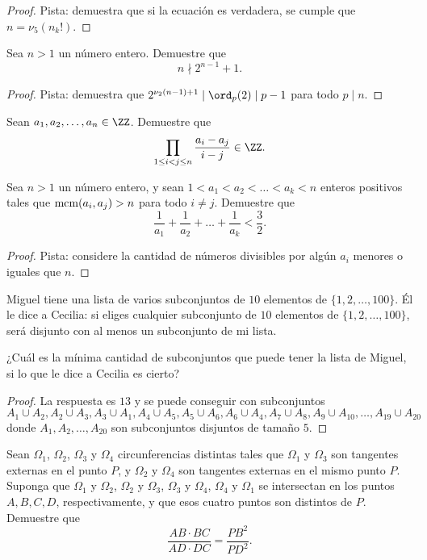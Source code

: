 \begin{proof}
	Pista: demuestra que si la ecuación es verdadera, se cumple que $n=\nu_5(n_k!)$.
\end{proof}

\begin{probEG}
	Sea $n>1$ un número entero. Demuestre que
	\[n\nmid 2^{n-1}+1.\]
\end{probEG}

\begin{proof}
	Pista: demuestra que $2^{\nu_2(n-1)+1}\mid\ord_p(2)\mid p-1$ para todo $p\mid n$.
\end{proof}

\begin{probMG}
	Sean $a_1,a_2,\dots,a_n\in\ZZ$. Demuestre que
	\[\prod_{1\le i<j\le n}\frac{a_i-a_j}{i-j}\in\ZZ.\]
\end{probMG}

\begin{probMR}
	Sea $n>1$ un número entero, y sean $1<a_1<a_2<\dots<a_k<n$ enteros positivos tales que $\operatorname{mcm}(a_i,a_j)>n$ para todo $i\ne j$. Demuestre que
	\[\frac{1}{a_1}+\frac{1}{a_2}+\dots+\frac{1}{a_k}<\frac32.\]
\end{probMR}

\begin{proof}
	Pista: considere la cantidad de números divisibles por algún $a_i$ menores o iguales que $n$.
\end{proof}

\begin{probEG}
	Miguel tiene una lista de varios subconjuntos de $10$ elementos de $\{1,2,\dots,100\}$. Él le dice a Cecilia: si eliges cualquier subconjunto de $10$ elementos de $\{1,2,\dots,100\}$, será disjunto con al menos un subconjunto de mi lista.

	¿Cuál es la mínima cantidad de subconjuntos que puede tener la lista de Miguel, si lo que le dice a Cecilia es cierto?
\end{probEG}

\begin{proof}
	La respuesta es $13$ y se puede conseguir con subconjuntos
	\[A_1\cup A_2,A_2\cup A_3,A_3\cup A_1,A_4\cup A_5,A_5\cup A_6,A_6\cup A_4,A_7\cup A_8,A_9\cup A_{10},\dots,A_{19}\cup A_{20}\]
	donde $A_1,A_2,\dots,A_{20}$ son subconjuntos disjuntos de tamaño $5$.
\end{proof}

\begin{probEG}
	Sean $\Omega_1$, $\Omega_2$, $\Omega_3$ y $\Omega_4$ circunferencias distintas tales que $\Omega_1$ y $\Omega_3$ son tangentes externas en el punto $P$, y $\Omega_2$ y $\Omega_4$ son tangentes externas en el mismo punto $P$. Suponga que $\Omega_1$ y $\Omega_2$, $\Omega_2$ y $\Omega_3$, $\Omega_3$ y $\Omega_4$, $\Omega_4$ y $\Omega_1$ se intersectan en los puntos $A,B,C,D$, respectivamente, y que esos cuatro puntos son distintos de $P$. Demuestre que
	\[\frac{AB\cdot BC}{AD\cdot DC}=\frac{PB^2}{PD^2}.\]
\end{probEG}

